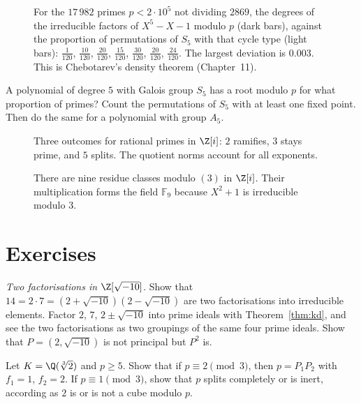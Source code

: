 \begin{figure}[ht]
\centering
{}
\caption{For the $17\,982$ primes $p<2\cdot10^5$ not dividing $2869$, the degrees of the irreducible factors of
$X^5-X-1$ modulo $p$ (dark bars), against the proportion of permutations of $S_5$ with that cycle type (light bars):
$\frac1{120}$, $\frac{10}{120}$, $\frac{20}{120}$, $\frac{15}{120}$, $\frac{30}{120}$, $\frac{20}{120}$,
$\frac{24}{120}$. The largest deviation is $0.003$. This is Chebotarev's density theorem (Chapter~11).}
\label{fig:cycletypes}
\end{figure}

\begin{think}
A polynomial of degree $5$ with Galois group $S_5$ has a root modulo $p$ for what proportion of primes? Count the
permutations of $S_5$ with at least one fixed point. Then do the same for a polynomial with group $A_5$.
\end{think}

\begin{figure}[ht]
\centering
{}
\caption{Three outcomes for rational primes in $\Z[i]$: $2$ ramifies, $3$ stays prime, and $5$ splits. The quotient norms account for all exponents.}
\label{fig:v13-extra-04-a}
\end{figure}

\begin{figure}[ht]
\centering
{}
\caption{There are nine residue classes modulo $(3)$ in $\Z[i]$. Their multiplication forms the field $\mathbb F_9$ because $X^2+1$ is irreducible modulo $3$.}
\label{fig:v13-extra-04-b}
\end{figure}

\section{Exercises}

\begin{exercise}[$\star$]\label{ex:sqrtm10}
\emph{Two factorisations in $\Z[\sqrt{-10}]$.} Show that $14=2\cdot7=(2+\sqrt{-10})(2-\sqrt{-10})$ are two
factorisations into irreducible elements. Factor $2$, $7$, $2\pm\sqrt{-10}$ into prime ideals with
Theorem~\ref{thm:kd}, and see the two factorisations as two groupings of the same four prime ideals. Show that
$P=(2,\sqrt{-10})$ is not principal but $P^2$ is.
\end{exercise}

\begin{exercise}[$\star$]\label{ex:cubic}
Let $K=\Q(\sqrt[3]2)$ and $p\ge5$. Show that if $p\equiv2\pmod 3$, then $p=P_1P_2$ with $f_1=1$, $f_2=2$. If
$p\equiv1\pmod3$, show that $p$ splits completely or is inert, according as $2$ is or is not a cube modulo $p$.
\end{exercise}

